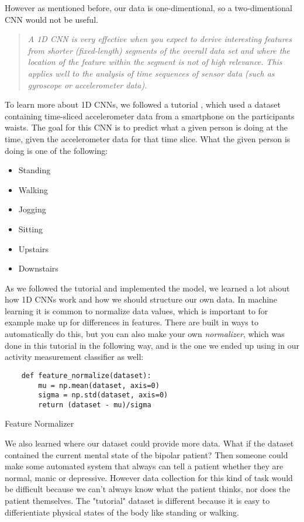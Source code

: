 However as mentioned before, our data is one-dimentional, so a two-dimentional CNN would not be useful.

\begin{quote}
  \textit{A 1D CNN is very effective when you expect to derive interesting features from shorter (fixed-length) segments of the overall data set 
  and where the location of the feature within the segment is not of high relevance. This applies well to the analysis of time sequences of sensor data 
  (such as gyroscope or accelerometer data).} \cite{1d_cnn}
\end{quote}

To learn more about 1D CNNs, we followed a tutorial \cite{1d_cnn}, which used a dataset containing 
time-sliced accelerometer data from a smartphone on the participants waists. The goal for this CNN is to predict what a given person is doing 
at the time, given the accelerometer data for that time slice. What the given person is doing is one of the following:
\begin{itemize}
  \item Standing
  \item Walking
  \item Jogging
  \item Sitting
  \item Upstairs
  \item Downstairs
\end{itemize}

As we followed the tutorial and implemented the model, we learned a lot about how 1D CNNs work and how we should structure our own data. 
In machine learning it is common to normalize data values, which is important to for example make up for differences in features. 
There are built in ways to automatically do this, but you can also make your own \textit{normalizer}, which was done in this tutorial in the following way, 
and is the one we ended up using in our activity measurement classifier as well:

\begin{code} 
  \begin{verbatim}
    def feature_normalize(dataset):
        mu = np.mean(dataset, axis=0)
        sigma = np.std(dataset, axis=0)
        return (dataset - mu)/sigma
  \end{verbatim}
  \caption{Feature Normalizer}
  \label{code:feature_normalizer}
\end{code}

We also learned where our dataset could provide more data. 
What if the dataset contained the current mental state of the bipolar patient? Then someone could make some automated system that always can tell a patient 
whether they are normal, manic or depressive. However data collection for this kind of task would be difficult because we can't always know what the
patient thinks, nor does the patient themselves. The "tutorial" dataset is different because it is easy to differientiate physical states of the body
like standing or walking.

